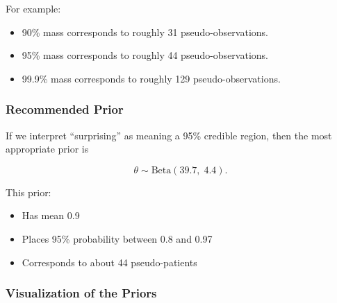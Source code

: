 \documentclass[
  letterpaper,
  DIV=11,
  numbers=noendperiod]{scrartcl}
\providecommand{\tightlist}{%
  \setlength{\itemsep}{0pt}\setlength{\parskip}{0pt}}\usepackage{longtable,booktabs,array}
\begin{document}
For example:

\begin{itemize}
\tightlist
\item
  90\% mass corresponds to roughly 31 pseudo-observations.
\item
  95\% mass corresponds to roughly 44 pseudo-observations.
\item
  99.9\% mass corresponds to roughly 129 pseudo-observations.
\end{itemize}

\subsubsection{Recommended Prior}\label{recommended-prior}

If we interpret ``surprising'' as meaning a 95\% credible region, then
the most appropriate prior is

\[
\boxed{
\theta \sim \text{Beta}(39.7,\;4.4).
}
\]

This prior:

\begin{itemize}
\tightlist
\item
  Has mean 0.9\\
\item
  Places 95\% probability between 0.8 and 0.97\\
\item
  Corresponds to about 44 pseudo-patients
\end{itemize}

\subsubsection{Visualization of the
Priors}\label{visualization-of-the-priors}
\end{document}
